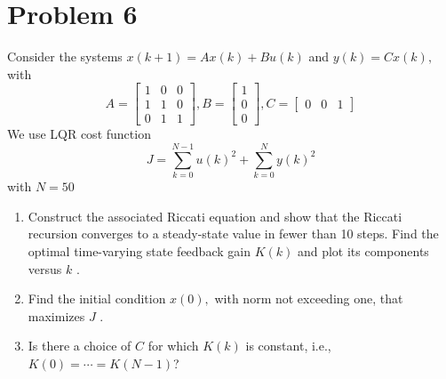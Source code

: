 \documentclass[10pt,a4paper,oneside]{article}
\begin{document}
\section* {Problem 6} 
Consider the systems $x(k+1)=A x(k)+B u(k)$ and $y(k)=C x(k),$ with
\[
A=\left[\begin{array}{lll}{1} & {0} & {0} \\ {1} & {1} & {0} \\ {0} & {1} & {1}\end{array}\right], B=\left[\begin{array}{l}{1} \\ {0} \\ {0}\end{array}\right], C=\left[\begin{array}{lll}{0} & {0} & {1}\end{array}\right]
\]
We use LQR cost function
\[
J=\sum_{k=0}^{N-1} u(k)^{2}+\sum_{k=0}^{N} y(k)^{2}
\]
with $N=50$
\begin{enumerate}
\item Construct the associated Riccati equation and show that the Riccati recursion converges to a
steady-state value in fewer than 10 steps. Find the optimal time-varying state feedback gain
$K(k)$ and plot its components versus $k$ .
\item Find the initial condition $x(0),$ with norm not exceeding one, that maximizes $J$ .
\item Is there a choice of $C$ for which $K(k)$ is constant, i.e., $K(0)=\cdots=K(N-1) $?
\end{enumerate}
\end{document}
